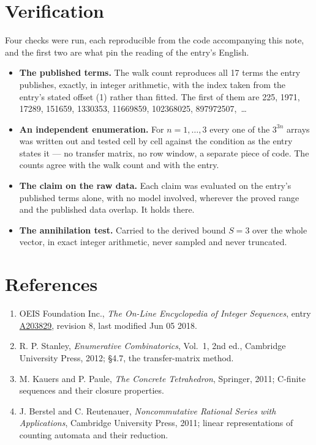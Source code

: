 \documentclass[11pt]{article}
\theoremstyle{definition}
\begin{document}
\section{Verification}

Four checks were run, each reproducible from the code accompanying this note, and the first two are what pin the reading of the entry's English.

\begin{itemize}

\item {\bfseries The published terms.} The walk count reproduces all 17 terms the entry publishes, exactly, in integer arithmetic, with the index taken from the entry's stated offset (1) rather than fitted. The first of them are 225, 1971, 17289, 151659, 1330353, 11669859, 102368025, 897972507,~\dots

\item {\bfseries An independent enumeration.} For $n = 1,\dots,3$ every one of the $3^{3n}$ arrays was written out and tested cell by cell against the condition as the entry states it --- no transfer matrix, no row window, a separate piece of code. The counts agree with the walk count and with the entry.

\item {\bfseries The claim on the raw data.} Each claim was evaluated on the entry's published terms alone, with no model involved, wherever the proved range and the published data overlap. It holds there.

\item {\bfseries The annihilation test.} Carried to the derived bound $S = 3$ over the whole vector, in exact integer arithmetic, never sampled and never truncated.

\end{itemize}

\section{References}

\begin{enumerate}

\item OEIS Foundation Inc., \emph{The On-Line Encyclopedia of Integer Sequences}, entry \href{https://oeis.org/A203829}{A203829}, revision 8, last modified Jun 05 2018.

\item R. P. Stanley, \emph{Enumerative Combinatorics}, Vol.~1, 2nd ed., Cambridge University Press, 2012; \S4.7, the transfer-matrix method.

\item M. Kauers and P. Paule, \emph{The Concrete Tetrahedron}, Springer, 2011; C-finite sequences and their closure properties.

\item J. Berstel and C. Reutenauer, \emph{Noncommutative Rational Series with Applications}, Cambridge University Press, 2011; linear representations of counting automata and their reduction.

\end{enumerate}
\end{document}
